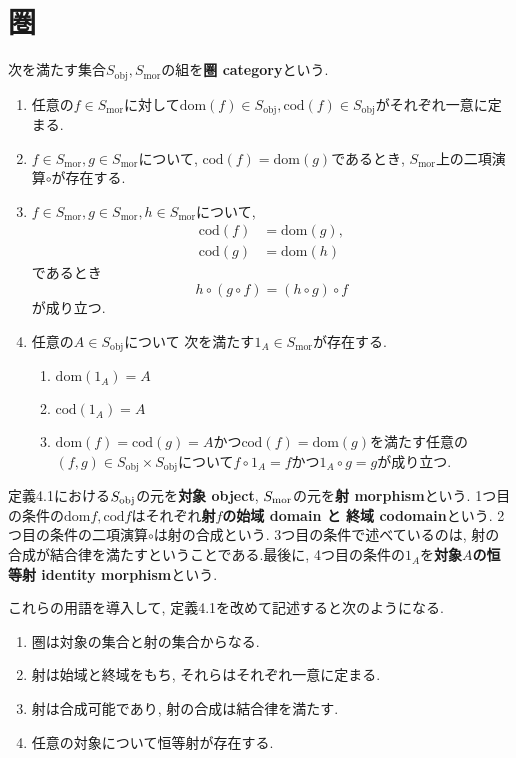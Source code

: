 \section{圏}
\begin{Def}
次を満たす集合$S_{\mathrm{obj}},S_{\mathrm{mor}}$の組を{\bf 圏 category}という.
\begin{enumerate}
\item 任意の$f\in S_\mathrm{mor}$に対して$\mathrm{dom}(f)\in S_\mathrm{obj},\mathrm{cod}(f)\in S_\mathrm{obj}$がそれぞれ一意に定まる.
\item $f\in S_{\mathrm{mor}},g\in S_{\mathrm{mor}}$について,
$\mathrm{cod}(f)=\mathrm{dom}(g)$であるとき,
$S_{\mathrm{mor}}$上の二項演算$\circ$が存在する.
\item $f\in S_{\mathrm{mor}},g\in S_{\mathrm{mor}},h\in S_{\mathrm{mor}}$について, \begin{align*}
\mathrm{cod}(f)&=\mathrm{dom}(g),\\ \mathrm{cod}(g)&=\mathrm{dom}(h)
\end{align*}であるとき
\[
h\circ(g\circ f)=(h\circ g)\circ f
\]
が成り立つ.
\item 任意の$A\in S_{\mathrm{obj}}$について
次を満たす$1_A\in S_{\mathrm{mor}}$が存在する.
\begin{enumerate}
\item
$\mathrm{dom}(1_{A})=A$
\item
$\mathrm{cod}(1_A)=A$
\item $\mathrm{dom}(f)=\mathrm{cod} (g)=A$かつ$\mathrm{cod} (f)=\mathrm{dom}(g)$を満たす任意の$(f,g)\in S_{\mathrm{obj}}\times S_{\mathrm{obj}}$について$f\circ 1_A=f$かつ$1_A\circ g=g$が成り立つ.
\end{enumerate}
\end{enumerate}
\end{Def}
定義4.1における$S_{\rm obj}$の元を{\bf 対象 object}, $S_{\rm mor}$の元を{\bf 射 morphism}という.
1つ目の条件の$\mathrm{dom} f,\mathrm{cod} f$はそれぞれ{\bf 射$f$の始域 domain と 終域 codomain}という. 2つ目の条件の二項演算$\circ$は射の合成という. 3つ目の条件で述べているのは, 射の合成が結合律を満たすということである.最後に, 4つ目の条件の$1_A$を{\bf 対象$A$の恒等射 identity morphism}という.

これらの用語を導入して, 定義4.1を改めて記述すると次のようになる.
\begin{enumerate}
\item
圏は対象の集合と射の集合からなる.
\item
射は始域と終域をもち, それらはそれぞれ一意に定まる.
\item
射は合成可能であり, 射の合成は結合律を満たす.
\item
任意の対象について恒等射が存在する.
\end{enumerate}


